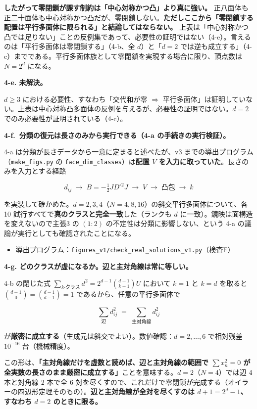 \documentclass[
  10pt,
]{ltjsarticle}
\providecommand{\tightlist}{%
  \setlength{\itemsep}{0pt}\setlength{\parskip}{0pt}}
\begin{document}
\textbf{したがって零閉鎖が課す制約は「中心対称かつ凸」より真に強い。}
正八面体も正二十面体も中心対称かつ凸だが、零閉鎖しない。\textbf{ただしここから「零閉鎖する配置は平行多面体に限られる」と結論してはならない。}
上表は「中心対称かつ凸では足りない」ことの反例集であって、必要性の証明ではない（4-e）。言えるのは「平行多面体は零閉鎖する」（4-b、全
\(d\)）と「\(d=2\)
では逆も成立する」（4-c）までである。平行多面体族として零閉鎖を実現する場合に限り、頂点数は
\(N=2^d\) になる。

\textbf{4-e. 未解決。}

\(d \ge 3\) における必要性、すなわち「交代和が零 \(\Rightarrow\)
平行多面体」は証明していない。上表は中心対称凸多面体の反例を与えるが、必要性の証明ではない。\(d=2\)
でのみ必要性が証明されている（4-c）。

\textbf{4-f.~分類の復元は長さのみから実行できる（4-a
の手続きの実行検証）。}

4-a は分類が長さデータから一意に定まると述べたが、v3
までの導出プログラム（\texttt{make\_figs.py} の
\texttt{face\_dim\_classes}）は\textbf{配置 \(V\)
を入力に取っていた}。長さのみを入力とする経路

\[d_{ij} \;\longrightarrow\; B = -\tfrac12 JD^{\circ2}J \;\longrightarrow\; V \;\longrightarrow\; \text{凸包} \;\longrightarrow\; k\]

を実装して確かめた。\(d = 2, 3, 4\)（\(N = 4, 8, 16\)）の斜交平行多面体について、各
10 試行すべてで\textbf{真のクラスと完全一致}した（ランクも \(d\)
に一致）。鏡映は面構造を変えないので主張3 の \((1{:}2)\)
の不定性は分類に影響しない、という 4-a
の議論が実行としても確認されたことになる。

\begin{itemize}
\tightlist
\item
  導出プログラム：\texttt{figures\_v1/check\_real\_solutions\_v1.py}（検査F）
\end{itemize}

\textbf{4-g. どのクラスが虚になるか。辺と主対角線は常に等しい。}

4-b の閉じた式 \(\sum_{k\text{-クラス}}d^2 = 2^{d-1}\binom{d-1}{k-1}U\)
において \(k=1\) と \(k=d\) を取ると
\(\binom{d-1}{0} = \binom{d-1}{d-1} = 1\) であるから、任意の平行多面体で

\[\sum_{\text{辺}} d_{ij}^2 \;=\; \sum_{\text{主対角線}} d_{ij}^2\]

が\textbf{厳密に成立する}（生成元は斜交でよい）。数値確認：\(d=2,\dots,6\)
で相対残差 \(10^{-16}\) 台（機械精度）。

この形は、\textbf{「主対角線だけを虚数と読めば、辺と主対角線の範囲で
\(\sum x_n^2 = 0\)
が全実数の長さのまま厳密に成立する」}ことを意味する。\(d=2\)（\(N=4\)）では辺
4 本と対角線 2 本で全 6
対を尽くすので、これだけで零閉鎖が完成する（オイラーの四辺形定理そのもの）。\textbf{辺と主対角線が全対を尽くすのは
\(d+1 = 2^d-1\)、すなわち \(d=2\) のときに限る。}
\end{document}
